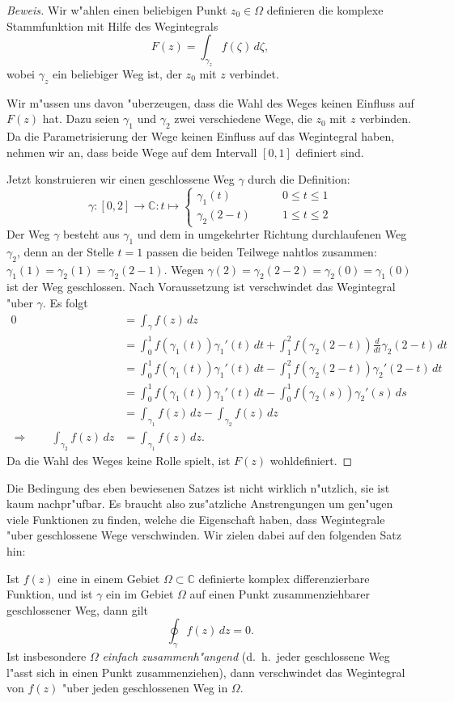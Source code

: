 \begin{proof}[Beweis]
Wir w"ahlen einen beliebigen Punkt $z_0\in\Omega$ definieren die
komplexe Stammfunktion mit Hilfe des Wegintegrals
\[
F(z)=\int_{\gamma_z} f(\zeta)\,d\zeta,
\]
wobei $\gamma_z$ ein beliebiger Weg ist, der $z_0$ mit $z$ verbindet.

Wir m"ussen uns davon "uberzeugen, dass die Wahl des Weges keinen Einfluss
auf $F(z)$ hat.
Dazu seien $\gamma_1$ und $\gamma_2$ zwei verschiedene Wege, die
$z_0$ mit $z$ verbinden.
Da die Parametrisierung der Wege keinen Einfluss auf das Wegintegral haben,
nehmen wir an, dass beide Wege auf dem Intervall $[0,1]$ definiert sind.

Jetzt konstruieren wir einen geschlossene Weg $\gamma$ durch die
Definition:
\[
\gamma\colon[0,2]\to\mathbb C:t\mapsto
\begin{cases}
\gamma_1(t)&\qquad 0\le t\le 1\\
\gamma_2(2-t)&\qquad 1\le t\le 2
\end{cases}
\]
Der Weg $\gamma$ besteht aus $\gamma_1$ und dem in umgekehrter Richtung
durchlaufenen Weg $\gamma_2$, denn an der Stelle $t=1$ passen die
beiden Teilwege nahtlos zusammen: $\gamma_1(1)=\gamma_2(1)=\gamma_2(2-1)$.
Wegen $\gamma(2)=\gamma_2(2-2)=\gamma_2(0)=\gamma_1(0)$ ist der
Weg geschlossen.
Nach Voraussetzung ist verschwindet das Wegintegral "uber $\gamma$.
Es folgt
\begin{align*}
0
&=
\int_{\gamma}f(z)\,dz
\\
&=
\int_0^1 f(\gamma_1(t))\gamma_1'(t)\,dt
+ \int_1^2f(\gamma_2(2-t))\frac{d}{dt}\gamma_2(2-t)\,dt
\\
&=
\int_0^1 f(\gamma_1(t))\gamma_1'(t)\,dt
- \int_1^2f(\gamma_2(2-t))\gamma_2'(2-t)\,dt
\\
&=
\int_0^1 f(\gamma_1(t))\gamma_1'(t)\,dt
- \int_0^1f(\gamma_2(s))\gamma_2'(s)\,ds
\\
&=
\int_{\gamma_1}f(z)\,dz - \int_{\gamma_2}f(z)\,dz
\\
\Rightarrow\qquad
\int_{\gamma_2}f(z)\,dz&=\int_{\gamma_1}f(z)\,dz.
\end{align*}
Da die Wahl des Weges keine Rolle spielt, ist $F(z)$ wohldefiniert.
\end{proof}

Die Bedingung des eben bewiesenen Satzes ist nicht wirklich n"utzlich,
sie ist kaum nachpr"ufbar.
Es braucht also zus"atzliche Anstrengungen um gen"ugen viele
Funktionen zu finden, welche die Eigenschaft haben, dass Wegintegrale
"uber geschlossene Wege verschwinden.
Wir zielen dabei auf den folgenden Satz hin:
\begin{satz}[Cauchy]
Ist $f(z)$ eine in einem Gebiet $\Omega\subset\mathbb C$ definierte
komplex differenzierbare Funktion, und ist $\gamma$ ein im Gebiet
$\Omega$ auf einen Punkt zusammenziehbarer geschlossener Weg, dann gilt
\[
\oint_{\gamma}f(z)\,dz=0.
\]
Ist insbesondere $\Omega$ {\em einfach zusammenh"angend}
(d.~h.~jeder geschlossene Weg l"asst sich in einen Punkt zusammenziehen),
dann verschwindet das Wegintegral von $f(z)$ "uber jeden geschlossenen
Weg in $\Omega$.
\end{satz}

